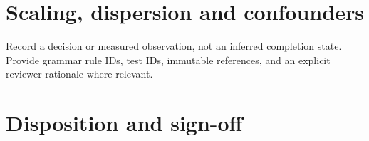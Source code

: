 \documentclass[11pt,letterpaper]{article}
\begin{document}
\section{Scaling, dispersion and confounders}
Record a decision or measured observation, not an inferred completion state. Provide grammar rule IDs, test IDs, immutable references, and an explicit reviewer rationale where relevant.
\section{Disposition and sign-off}
\end{document}
